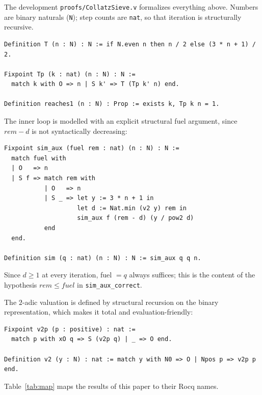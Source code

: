 \documentclass[11pt,a4paper]{article}
\theoremstyle{plain}
\theoremstyle{definition}
\begin{document}
The development \texttt{proofs/CollatzSieve.v} formalizes everything above.
Numbers are binary naturals (\texttt{N}); step counts are \texttt{nat}, so
that iteration is structurally recursive.

\begin{lstlisting}[style=rocq]
Definition T (n : N) : N := if N.even n then n / 2 else (3 * n + 1) / 2.

Fixpoint Tp (k : nat) (n : N) : N :=
  match k with O => n | S k' => T (Tp k' n) end.

Definition reaches1 (n : N) : Prop := exists k, Tp k n = 1.
\end{lstlisting}

The inner loop is modelled with an explicit structural fuel argument, since
$\mathit{rem} - d$ is not syntactically decreasing:

\begin{lstlisting}[style=rocq]
Fixpoint sim_aux (fuel rem : nat) (n : N) : N :=
  match fuel with
  | O   => n
  | S f => match rem with
           | O   => n
           | S _ => let y := 3 * n + 1 in
                    let d := Nat.min (v2 y) rem in
                    sim_aux f (rem - d) (y / pow2 d)
           end
  end.

Definition sim (q : nat) (n : N) : N := sim_aux q q n.
\end{lstlisting}

Since $d \geq 1$ at every iteration, fuel $= q$ always suffices; this is the
content of the hypothesis $\mathit{rem} \leq \mathit{fuel}$ in
\texttt{sim\_aux\_correct}.

The $2$-adic valuation is defined by structural recursion on the binary
representation, which makes it total and evaluation-friendly:

\begin{lstlisting}[style=rocq]
Fixpoint v2p (p : positive) : nat :=
  match p with xO q => S (v2p q) | _ => O end.

Definition v2 (y : N) : nat := match y with N0 => O | Npos p => v2p p end.
\end{lstlisting}

Table~\ref{tab:map} maps the results of this paper to their Rocq names.
\end{document}
